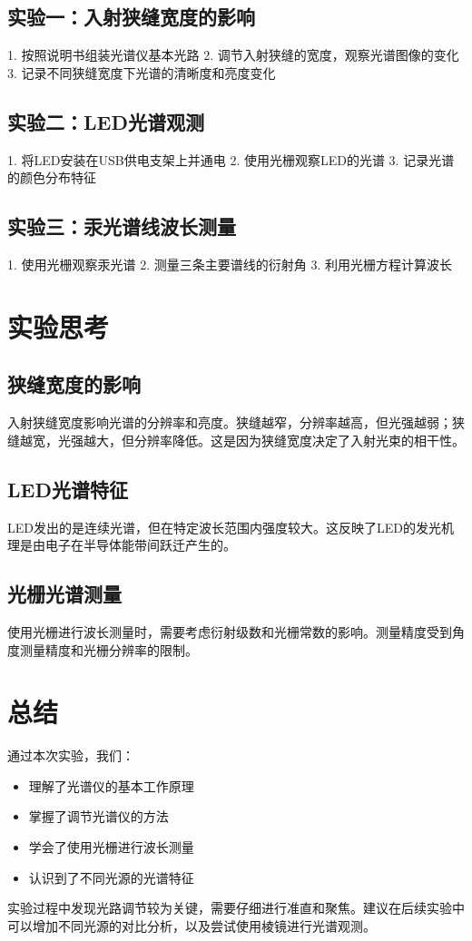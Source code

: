 \documentclass{ctexart}
\begin{document}
\subsection{实验一：入射狭缝宽度的影响}
1. 按照说明书组装光谱仪基本光路
2. 调节入射狭缝的宽度，观察光谱图像的变化
3. 记录不同狭缝宽度下光谱的清晰度和亮度变化

\subsection{实验二：LED光谱观测}
1. 将LED安装在USB供电支架上并通电
2. 使用光栅观察LED的光谱
3. 记录光谱的颜色分布特征

\subsection{实验三：汞光谱线波长测量}
1. 使用光栅观察汞光谱
2. 测量三条主要谱线的衍射角
3. 利用光栅方程计算波长

\section{实验思考}

\subsection{狭缝宽度的影响}
入射狭缝宽度影响光谱的分辨率和亮度。狭缝越窄，分辨率越高，但光强越弱；狭缝越宽，光强越大，但分辨率降低。这是因为狭缝宽度决定了入射光束的相干性。

\subsection{LED光谱特征}
LED发出的是连续光谱，但在特定波长范围内强度较大。这反映了LED的发光机理是由电子在半导体能带间跃迁产生的。

\subsection{光栅光谱测量}
使用光栅进行波长测量时，需要考虑衍射级数和光栅常数的影响。测量精度受到角度测量精度和光栅分辨率的限制。

\section{总结}

通过本次实验，我们：
\begin{itemize}
    \item 理解了光谱仪的基本工作原理
    \item 掌握了调节光谱仪的方法
    \item 学会了使用光栅进行波长测量
    \item 认识到了不同光源的光谱特征
\end{itemize}

实验过程中发现光路调节较为关键，需要仔细进行准直和聚焦。建议在后续实验中可以增加不同光源的对比分析，以及尝试使用棱镜进行光谱观测。
\end{document}
